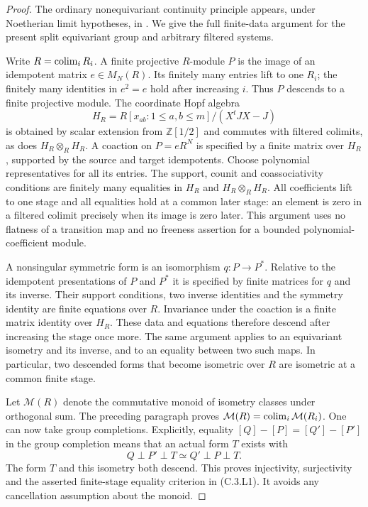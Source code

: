 \begin{proof}
The ordinary nonequivariant continuity principle appears, under
Noetherian limit hypotheses, in
\cite[Appendix B, Lemma 49 and Corollary 51, pp.26--27]{C-BachmannContinuity}.
We give the full finite-data argument for the present split equivariant
group and arbitrary filtered systems.

Write $R=\mathop{\rm colim}_iR_i$. A finite projective $R$-module
$P$ is the image of an idempotent matrix $e\in M_N(R)$.
Its finitely many entries lift to one $R_i$; the finitely many
identities in $e^2=e$ hold after increasing $i$.
Thus $P$ descends to a finite projective module.
The coordinate Hopf algebra
\[
 H_R=R[x_{ab}:1\leq a,b\leq m]/(X^tJX-J)
\]
is obtained by scalar extension from $\mathbb Z[1/2]$ and commutes
with filtered colimits, as does $H_R\otimes_RH_R$.
A coaction on $P=eR^N$ is specified by a finite matrix over $H_R$,
supported by the source and target idempotents. Choose polynomial
representatives for all its entries. The support, counit and
coassociativity conditions are finitely many equalities in $H_R$
and $H_R\otimes_RH_R$. All coefficients lift to one stage and all
equalities hold at a common later stage: an element is zero in a
filtered colimit precisely when its image is zero later. This
argument uses no flatness of a transition map and no freeness
assertion for a bounded polynomial-coefficient module.

A nonsingular symmetric form is an isomorphism $q:P\to P^*$.
Relative to the idempotent presentations of $P$ and $P^*$ it is
specified by finite matrices for $q$ and its inverse. Their support
conditions, two inverse identities and the symmetry identity are
finite equations over $R$. Invariance under the coaction is a
finite matrix identity over $H_R$. These data and equations
therefore descend after increasing the stage once more.
The same argument applies to an equivariant isometry and its
inverse, and to an equality between two such maps. In particular,
two descended forms that become isometric over $R$ are isometric
at a common finite stage.

Let $\mathcal M(R)$ denote the commutative monoid of isometry
classes under orthogonal sum. The preceding paragraph proves
$\mathcal M(R)=\mathop{\rm colim}_i\mathcal M(R_i)$.
One can now take group completions. Explicitly, equality
$[Q]-[P]=[Q']-[P']$ in the group completion means that an actual
form $T$ exists with
\[
 Q\perp P'\perp T\simeq Q'\perp P\perp T.
\]
The form $T$ and this isometry both descend. This proves
injectivity, surjectivity and the asserted finite-stage equality
criterion in (C.3.L1). It avoids any cancellation assumption about
the monoid.


\end{proof}
